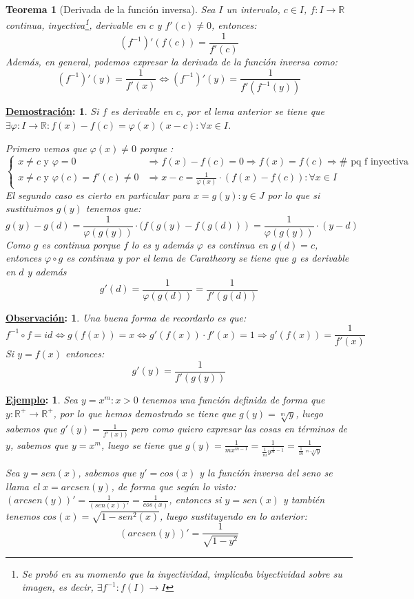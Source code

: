 \documentclass[10pt,a4paper,openright]{book}
\theoremstyle{break}
\newtheorem*{theo}{Teorema}
\newtheorem*{demo}{\underline{Demostración}:}
\newtheorem*{obs}{\underline{Observación}:}
\newtheorem*{ej}{\underline{Ejemplo}:}
\begin{document}
\begin{theo}[Derivada de la función inversa]
Sea $I$ un intervalo, $c\in I$, $f:I\rightarrow \mathbb R$ continua, inyectiva\footnote{Se probó en su momento que la inyectividad, implicaba biyectividad sobre su imagen, es decir, $\exists f^{-1}: f(I)\rightarrow I$}, derivable en $c$ y $f'(c)\neq 0$, entonces:
$$(f^{-1})'(f(c))=\frac{1}{f'(c)}$$
Además, en general, podemos expresar la derivada de la función inversa como:
$$(f^{-1})'(y)=\frac{1}{f'(x)} \Leftrightarrow (f^{-1})'(y)=\frac{1}{f'(f^{-1}(y))}$$
\end{theo}
\begin{demo}
Si $f$ es derivable en $c$, por el lema anterior se tiene que $\exists \varphi: I \rightarrow\mathbb R: f(x)-f(c)=\varphi(x)(x-c): \forall x\in I$.

Primero vemos que $\varphi (x)\neq 0$ porque :
$$\begin{cases}x\neq c \mbox{ y } \varphi =0 & \Rightarrow f(x)-f(c)=0\Rightarrow f(x)=f(c)\Rightarrow \# \mbox{ pq f inyectiva}\\
x\neq c \mbox{ y } \varphi(c)= f'(c)\neq 0 &\Rightarrow x-c=\frac{1}{\varphi(x)}\cdot (f(x)-f(c)): \forall x\in I
\end{cases}$$
El segundo caso es cierto en particular para $x=g(y): y\in J$ por lo que si sustituimos $g(y)$ tenemos que:
$$g(y)-g(d)=\frac{1}{\varphi(g(y))}\cdot (f(g(y)-f(g(d)))=\frac{1}{\varphi(g(y))}\cdot (y-d)$$
Como $g$ es continua porque $f$ lo es y además $\varphi$ es continua en $g(d)=c$, entonces $\varphi\circ g$ es continua y por el lema de Caratheory se tiene que $g$ es derivable en $d$ y además
$$g'(d)=\frac{1}{\varphi(g(d))}=\frac{1}{f'(g(d))}$$
\end{demo}

\begin{obs}
Una buena forma de recordarlo es que:
$$f^{-1}\circ f = id \Leftrightarrow g(f(x))=x\Leftrightarrow g'(f(x))\cdot f'(x)=1\Rightarrow g'(f(x))=\frac{1}{f'(x)}$$
Si $y=f(x)$ entonces:
$$g'(y)=\frac{1}{f'(g(y))}$$
\end{obs}

\begin{ej}
Sea $y=x^m: x>0$ tenemos una función definida de forma que $y: \mathbb R^+ \rightarrow \mathbb R^+$, por lo que hemos demostrado se tiene que $g(y)=\sqrt[m]{y}$, luego sabemos que $g'(y)=\frac{1}{f'(x))}$ pero como quiero expresar las cosas en términos de $y$, sabemos que $y=x^m$, luego se tiene que $g(y)=\frac{1}{mx^{m-1}}=\frac{1}{\frac{1}{m}y^{\frac{1}{m}-1}}=\frac{1}{\frac{1}{m}\sqrt[m-1]{y}}$

Sea $y=sen(x)$, sabemos que $y'=cos(x)$ y la función inversa del seno se llama el $x=arcsen(y)$, de forma que según lo visto: $(arcsen(y))'=\frac{1}{(sen(x))'}=\frac{1}{cos(x)}$, entonces si $y=sen(x)$ y también tenemos $cos(x)=\sqrt{1-sen^2(x)}$, luego sustituyendo en lo anterior:
$$(arcsen(y))'=\frac{1}{\sqrt{1-y^2}}$$
\end{ej}
\end{document}

